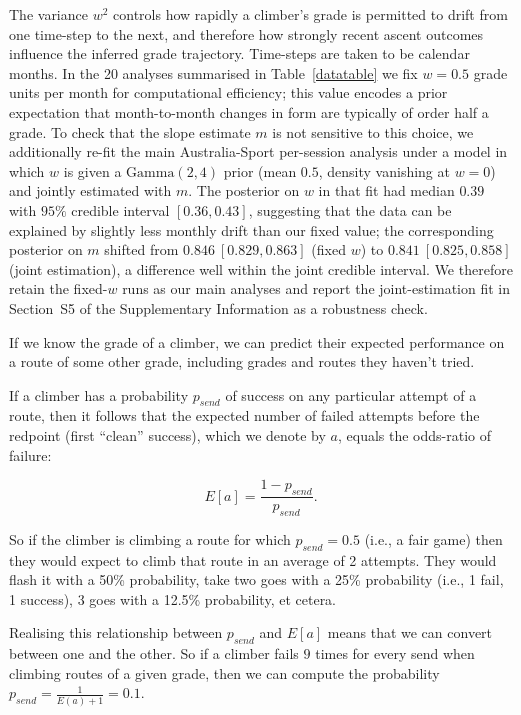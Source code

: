 \documentclass[12pt]{article}
\begin{document}
The variance $w^2$ controls how rapidly a climber's grade is permitted to drift from one time-step to the next, and therefore how strongly recent ascent outcomes influence the inferred grade trajectory. Time-steps are taken to be calendar months. In the 20 analyses summarised in Table~\ref{datatable} we fix $w = 0.5$ grade units per month for computational efficiency; this value encodes a prior expectation that month-to-month changes in form are typically of order half a grade. To check that the slope estimate $m$ is not sensitive to this choice, we additionally re-fit the main Australia-Sport per-session analysis under a model in which $w$ is given a $\mathrm{Gamma}(2, 4)$ prior (mean $0.5$, density vanishing at $w=0$) and jointly estimated with $m$. The posterior on $w$ in that fit had median $0.39$ with $95\%$ credible interval $[0.36, 0.43]$, suggesting that the data can be explained by slightly less monthly drift than our fixed value; the corresponding posterior on $m$ shifted from $0.846\ [0.829, 0.863]$ (fixed $w$) to $0.841\ [0.825, 0.858]$ (joint estimation), a difference well within the joint credible interval. We therefore retain the fixed-$w$ runs as our main analyses and report the joint-estimation fit in Section~S5 of the Supplementary Information as a robustness check.

If we know the grade of a climber, we can predict their expected performance on a route of some other grade, including grades and routes they haven't tried.

If a climber has a probability $p_{send}$ of success on any particular attempt of a route, then it follows that the expected number of failed attempts before the redpoint (first ``clean'' success), which we denote by $a$, equals the odds-ratio of failure:

\begin{equation}
 E\left[a\right]=\frac{1-p_{send}}{p_{send}}.
 \end{equation}

 So if the climber is climbing a route for which $p_{send}=0.5$ (i.e., a fair game) then they would expect to climb that route in an average of 2 attempts. They would flash it with a 50\% probability, take two goes with a 25\% probability (i.e., 1 fail, 1 success), 3 goes with a 12.5\% probability, et cetera.

Realising this relationship between $p_{send}$ and $ E\left[a\right]$ means that we can convert between one and the other. So if a climber fails $9$ times for every send when climbing routes of a given grade, then we can compute the probability  $p_{send} = \frac{1}{E(a)+1} = 0.1$.
\end{document}
